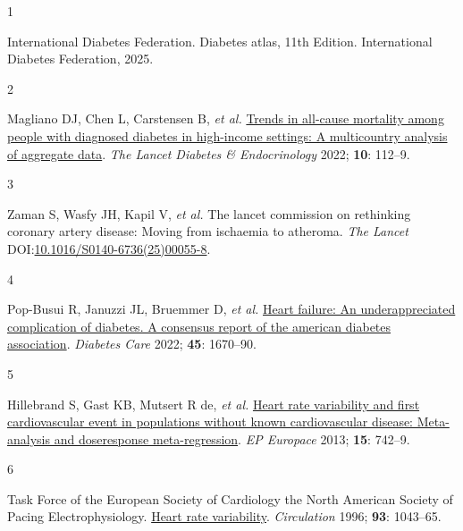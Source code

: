 \documentclass[
  a4paper,
  headsepline=true,
  open=left]{scrbook}
\newlength{\cslhangindent}
\newlength{\csllabelwidth}
\newlength{\cslentryspacingunit} %
\newenvironment{CSLReferences}[2] %
 {%
  \setlength{\parindent}{0pt}
  \ifodd #1
  \let\oldpar\par
  \def\par{\hangindent=\cslhangindent\oldpar}
  \fi
  \setlength{\parskip}{#2\cslentryspacingunit}
 }%
 {}
\newcommand{\CSLLeftMargin}[1]{\parbox[t]{\csllabelwidth}{#1}}
\newcommand{\CSLRightInline}[1]{\parbox[t]{\linewidth - \csllabelwidth}{#1}\break}
\begin{document}

\clearpage
\null
\thispagestyle{empty}
\clearpage

\hypertarget{refs}{}
\begin{CSLReferences}{0}{0}
\leavevmode{}%
\CSLLeftMargin{1 }%
\CSLRightInline{International Diabetes Federation. Diabetes atlas, 11th
Edition. International Diabetes Federation, 2025.}

\leavevmode{}%
\CSLLeftMargin{2 }%
\CSLRightInline{Magliano DJ, Chen L, Carstensen B, \emph{et al.}
\href{https://doi.org/10.1016/S2213-8587(21)00327-2}{Trends in all-cause
mortality among people with diagnosed diabetes in high-income settings:
A multicountry analysis of aggregate data}. \emph{The Lancet Diabetes \&
Endocrinology} 2022; \textbf{10}: 112--9.}

\leavevmode{}%
\CSLLeftMargin{3 }%
\CSLRightInline{Zaman S, Wasfy JH, Kapil V, \emph{et al.} The lancet
commission on rethinking coronary artery disease: Moving from ischaemia
to atheroma. \emph{The Lancet}
DOI:\href{https://doi.org/10.1016/S0140-6736(25)00055-8}{10.1016/S0140-6736(25)00055-8}.}

\leavevmode{}%
\CSLLeftMargin{4 }%
\CSLRightInline{Pop-Busui R, Januzzi JL, Bruemmer D, \emph{et al.}
\href{https://doi.org/10.2337/dci22-0014}{Heart failure: An
underappreciated complication of diabetes. A consensus report of the
american diabetes association}. \emph{Diabetes Care} 2022; \textbf{45}:
1670--90.}

\leavevmode{}%
\CSLLeftMargin{5 }%
\CSLRightInline{Hillebrand S, Gast KB, Mutsert R de, \emph{et al.}
\href{https://doi.org/10.1093/europace/eus341}{Heart rate variability
and first cardiovascular event in populations without known
cardiovascular disease: Meta-analysis and dose{\textendash}response
meta-regression}. \emph{EP Europace} 2013; \textbf{15}: 742--9.}

\leavevmode{}%
\CSLLeftMargin{6 }%
\CSLRightInline{Task Force of the European Society of Cardiology the
North American Society of Pacing Electrophysiology.
\href{https://doi.org/doi:10.1161/01.CIR.93.5.1043}{Heart rate
variability}. \emph{Circulation} 1996; \textbf{93}: 1043--65.}


\end{CSLReferences}
\end{document}
